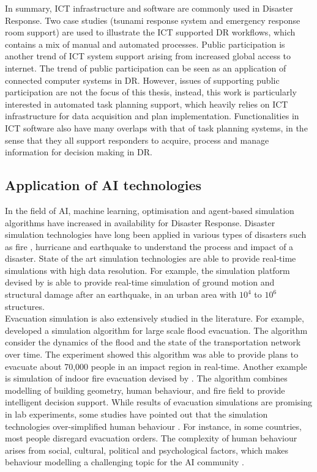 In summary, \ac{ICT} infrastructure and software are commonly used in Disaster Response. Two case studies (tsunami response system and emergency response room support) are used to illustrate the \ac{ICT} supported \ac{DR} workflows, which contains a mix of manual and automated processes. Public participation is another trend of \ac{ICT} system support arising from increased global access to internet. The trend of public participation can be seen as an application of connected computer systems in \ac{DR}. However, issues of supporting public participation are not the focus of this thesis, instead, this work is particularly interested in automated task planning support, which heavily relies on \ac{ICT} infrastructure for data acquisition and plan implementation. Functionalities in \ac{ICT} software also have many overlaps with that of task planning systems, in the sense that they all support responders to acquire, process and manage information for decision making in \ac{DR}. \\


\subsection{Application of AI technologies}\label{sec:lraisupport}
In the field of \ac{AI}, machine learning, optimisation and agent-based simulation algorithms have increased in availability for Disaster Response. Disaster simulation technologies \citep{Okaya,Scerri2005} have long been applied in various types of disasters such as fire \citep{Tang2012}, hurricane \citep{Vickery2009} and earthquake \citep{Sobhaninejad2011} to understand the process and impact of a disaster. State of the art simulation technologies are able to provide real-time simulations with high data resolution. For example, the simulation platform devised by \citep{Sobhaninejad2011} is able to provide real-time simulation of ground motion and structural damage after an earthquake, in an urban area with $10^{4}$ to $10^{6}$ structures. \\

Evacuation simulation is also extensively studied in the literature. For example, \cite{Pillac2015} developed a simulation algorithm for large scale flood evacuation. The algorithm consider the dynamics of the flood and the state of the transportation network over time. The experiment showed this algorithm was able to provide plans to evacuate about 70,000 people in an impact region in real-time.  Another example is simulation of indoor fire evacuation devised by \cite{Tang2012}.  The algorithm combines modelling of building geometry, human behaviour, and fire field to provide intelligent decision support. While results of evacuation simulations are promising in lab experiments, some studies have pointed out that the simulation technologies over-simplified human behaviour \citep{Hentenryck2011}. For instance, in some countries, most people disregard evacuation orders. The complexity of human behaviour arises from social, cultural, political and psychological factors, which makes behaviour modelling a challenging topic for the \ac{AI} community \citep{Provitolo2011} . \\

